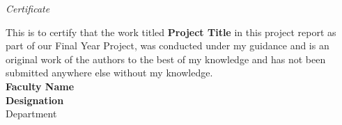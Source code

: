 \newpage
\thispagestyle{empty}

\begin{center}

\emph{\LARGE Certificate}\\[2.5cm]
\end{center}
\begin{center}
 

\normalsize This is to certify that the work titled \textbf{Project Title} in this
project report as part of our Final Year Project, was
conducted under my guidance and is an original work of the authors to the best of my knowledge
and has not been submitted anywhere else without my knowledge.
\\[1.0cm]



\textbf{Faculty Name}\\
\textbf{Designation}\\
Department\\
\end{center}
